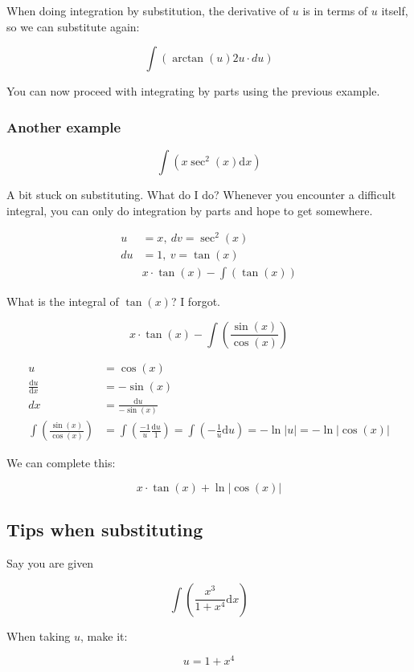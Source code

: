 \documentclass[12pt]{article}
\theoremstyle{plain}
\theoremstyle{remark}
\theoremstyle{definition}
\begin{document}
When doing integration by substitution, the derivative of \(u\) is in
terms of \(u\) itself, so we can substitute again:

\[\int\left( \arctan(u)2u \cdot du \right)\]

You can now proceed with integrating by parts using the previous
example.


\subsubsection{Another example}

\[\int\left( x\sec^{2}(x)\text{d}x \right)\]

A bit stuck on substituting. What do I do? Whenever you encounter a
difficult integral, you can only do integration by parts and hope to get
somewhere.

\begin{align*}
u &= x,\ dv = \sec^{2}(x) \\
du &= 1,\ v = \tan(x) \\
&x \cdot \tan(x) - \int\left( \tan(x) \right)
\end{align*}


What is the integral of \(\tan(x)\)? I forgot.

\[x \cdot \tan(x) - \int\left( \frac{\sin(x)}{\cos(x)} \right)\]

\begin{align*}
u &= \cos(x) \\
\frac{\text{d}u}{\text{d}x} &= - \sin(x) \\
dx &= \frac{\text{d}u}{- \sin(x)} \\
\int\left( \frac{\sin(x)}{\cos(x)} \right) &= \int\left( \frac{- 1}{u}\frac{\text{d}u}{1} \right) = \int\left( - \frac{1}{u}\text{d}u \right) = - \ln|u| = - \ln\left| \cos(x) \right|
\end{align*}


We can complete this:

\[x \cdot \tan(x) + \ln\left| \cos(x) \right|\]


\subsection{Tips when substituting}

Say you are given

\[\int\left( \frac{x^{3}}{1 + x^{4}}\text{d}x \right)\]

When taking \(u\), make it:

\[u = 1 + x^{4}\]
\end{document}
